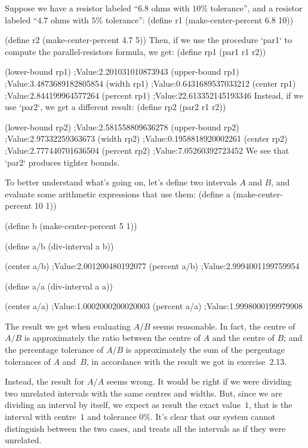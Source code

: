 Suppose we have a resistor labeled “$6.8$ ohms with $10\%$ tolerance”, and a resistor labeled “$4.7$ ohms with $5\%$ tolerance”:
\begtt\scm
(define r1 (make-center-percent 6.8 10))

(define r2 (make-center-percent 4.7 5))
\endtt
Then, if we use the procedure `par1` to compute the parallel-resistors formula, we get:
\begtt\scm
(define rp1 (par1 r1 r2))

(lower-bound rp1)
;Value:2.201031010873943
(upper-bound rp1)
;Value:3.4873689182805854
(width rp1)
;Value:0.6431689537033212
(center rp1)
;Value:2.844199964577264
(percent rp1)
;Value:22.613352145193346
\endtt
Instead, if we use `par2`, we get a different result:
\begtt\scm
(define rp2 (par2 r1 r2))

(lower-bound rp2)
;Value:2.581558809636278
(upper-bound rp2)
;Value:2.97332259363673
(width rp2)
;Value:0.1958818920002261
(center rp2)
;Value:2.777440701636504
(percent rp2)
;Value:7.05260392723452
\endtt
We see that `par2` produces tighter bounds.

To better understand what's going on, let's define two intervals $A$ and $B$, and evaluate some arithmetic expressions that use them:
\begtt\scm
(define a (make-center-percent 10 1))

(define b (make-center-percent 5 1))

(define a/b (div-interval a b))

(center a/b)
;Value:2.001200480192077
(percent a/b)
;Value:2.9994001199759954

(define a/a (div-interval a a))

(center a/a)
;Value:1.0002000200020003
(percent a/a)
;Value:1.9998000199979908
\endtt

The result we get when evaluating $A/B$ seems reasonable.  In fact, the centre of $A/B$ is approximately the ratio between the centre of $A$ and the centre of $B$; and the percentage tolerance of $A/B$ is approximately the sum of the pergentage tolerances of $A$ and~$B$, in accordance with the result we got in exercise~2.13.

Instead, the result for $A/A$ seems wrong.  It would be right if we were dividing two unrelated intervals with the same centres and widths.  But, since we are dividing an interval by itself, we expect as result the exact value~$1$, that is the interval with centre~$1$ and tolerance $0\%$.  It's clear that our system cannot distinguish between the two cases, and treats all the intervals as if they were unrelated.